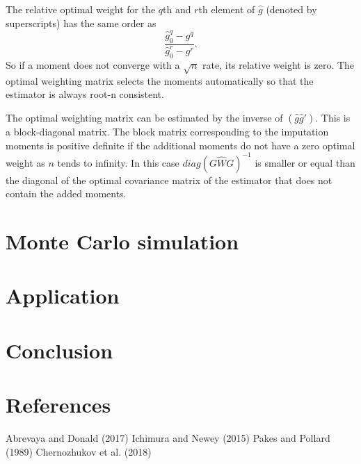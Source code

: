 \documentclass{article}
\theoremstyle{definition}
\theoremstyle{remark}
\begin{document}
The relative optimal weight for the $q$th and $r$th element of $\hat{g}$ (denoted by superscripts) has the same order as
\[\frac{\hat{g}_0^q-g^q}{\hat{g}_0^r-g^r}.
\]
So if a moment does not converge with a $\sqrt{n}$ rate, its relative weight is zero. The optimal weighting matrix selects the moments automatically so that the estimator is always root-n consistent.

The optimal weighting matrix can be estimated by the inverse of $(\hat{g}\hat{g}')$. This is a block-diagonal matrix. The block matrix corresponding to the imputation moments is positive definite if the additional moments do not have a zero optimal weight as $n$ tends to infinity. In this case $diag(G\hat{W}G)^{-1}$ is smaller or equal than the diagonal of the optimal covariance matrix of the estimator that does not contain the added moments.

\section{Monte Carlo simulation}


\section{Application}


\section{Conclusion}

\section{References}

Abrevaya and Donald (2017)
Ichimura and Newey (2015)
Pakes and Pollard (1989)
Chernozhukov et al. (2018)
\end{document}

